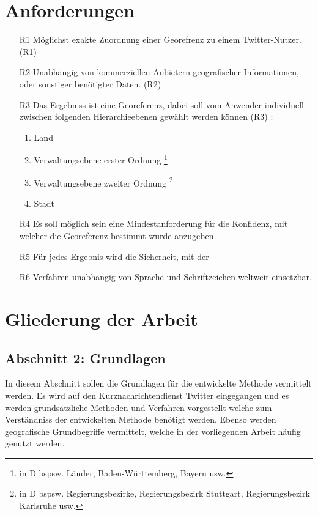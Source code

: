 	\section{Anforderungen}\label{sec:Anforderungen}
		\begin{enumerate}
			\item[R1] Möglichst exakte Zuordnung einer Georefrenz zu einem Twitter-Nutzer. (R1) 
			\item[R2] Unabhängig von kommerziellen Anbietern geografischer Informationen, oder sonstiger benötigter Daten. (R2)
			\item[R3] Das Ergebniss ist eine Georeferenz, dabei soll vom Anwender individuell zwischen folgenden Hierarchieebenen gewählt werden können (R3) : 
			\begin{enumerate}
			 	\item Land
			 	\item Verwaltungsebene erster Ordnung \footnote{in D bspsw. Länder, Baden-Württemberg, Bayern usw. }
			 	\item Verwaltungsebene zweiter Ordnung \footnote{in D bspsw. Regierungsbezirke, Regierungsbezirk Stuttgart, Regierungsbezirk Karlsruhe usw.}
			 	\item Stadt
			 \end{enumerate} 
			\item[R4] Es soll möglich sein eine Mindestanforderung für die Konfidenz, mit welcher die Georeferenz bestimmt wurde anzugeben.
			\item[R5] Für jedes Ergebnis wird die Sicherheit, mit der  
			\item[R6] Verfahren unabhängig von Sprache und Schriftzeichen weltweit einsetzbar.
		\end{enumerate}
		
	\section{Gliederung der Arbeit}

		\subsection*{Abschnitt 2: Grundlagen}
			In diesem Abschnitt sollen die Grundlagen für die entwickelte Methode vermittelt werden. 
			Es wird auf den Kurznachrichtendienst Twitter eingegangen und es werden grundsätzliche Methoden und Verfahren vorgestellt welche zum Verständniss der entwickelten Methode benötigt werden. Ebenso werden geografische Grundbegriffe vermittelt, welche in der vorliegenden Arbeit häufig genutzt werden.


